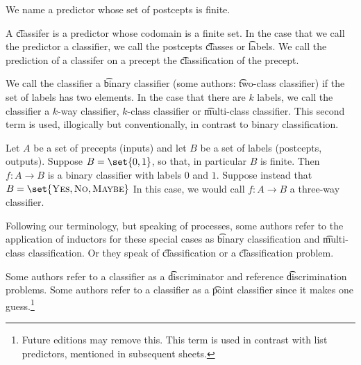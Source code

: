 

We name a predictor whose set of postcepts is finite.


A \t{classifer} is a predictor whose codomain is a finite set.
In the case that we call the predictor a classifier, we call the postcepts \t{classes} or \t{labels}.
We call the prediction of a classifer on a precept the \t{classification} of the precept.

We call the classifier a \t{binary classifier} (some authors: \t{two-class classifier}) if the set of labels has two elements.
In the case that there are $k$ labels, we call the classifier a \t{$k$-way classifier}, \t{$k$-class classifier} or \t{multi-class classifier}.
This second term is used, illogically but conventionally, in contrast to binary classification.

Let $A$ be a set of precepts (inputs) and let $B$ be a set of labels (postcepts, outputs).
Suppose $B = \set{0, 1}$, so that, in particular $B$ is finite.
Then $f: A \to B$ is a binary classifier with labels $0$ and $1$.
Suppose instead that $B = \set{\text{\textsc{Yes}}, \textsc{No}, \textsc{Maybe}}$
In this case, we would call $f: A \to B$ a three-way classifier.


Following our terminology, but speaking of processes, some authors refer to the application of inductors for these special cases as \t{binary classification} and \t{multi-class classification}.
Or they speak of \t{classification} or a \t{classification problem}.

Some authors refer to a classifier as a \t{discriminator} and reference \t{discrimination problems}.
Some authors refer to a classifier as a \t{point classifier} since it makes one guess.\footnote{Future editions may remove this. This term is used in contrast with list predictors, mentioned in subsequent sheets.}

